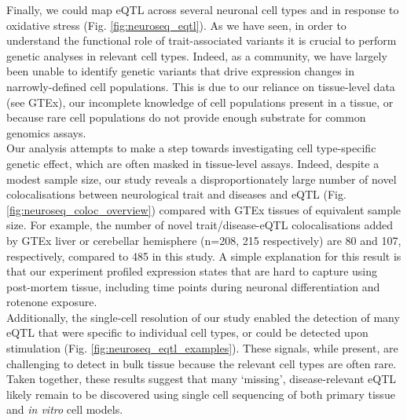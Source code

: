 
Finally,
we could map eQTL across several neuronal cell types and in response to oxidative stress (Fig. \ref{fig:neuroseq_eqtl}).
As we have seen, in order to understand the functional role of trait-associated variants it is crucial to perform genetic analyses in relevant cell types.
Indeed, as a community, we have largely been unable to identify genetic variants that drive expression changes in narrowly-defined cell populations.
This is due to our reliance on tissue-level data (see GTEx), our incomplete knowledge of cell populations present in a tissue, or because rare cell populations do not provide enough substrate for common genomics assays. \\

Our analysis attempts to make a step towards investigating cell type-specific genetic effect, which are often masked in tissue-level assays.
Indeed, despite a modest sample size, our study reveals a disproportionately large number of novel colocalisations between neurological trait and diseases and eQTL (Fig. \ref{fig:neuroseq_coloc_overview}) compared with GTEx tissues of equivalent sample size. 
For example, the number of novel trait/disease-eQTL colocalisations added by GTEx liver or cerebellar hemisphere (n=208, 215 respectively) are 80 and 107, respectively, compared to 485 in this study. 
A simple explanation for this result is that our experiment profiled expression states that are hard to capture using post-mortem tissue, including time points during neuronal differentiation and rotenone exposure. \\

Additionally, the single-cell resolution of our study enabled the detection of many eQTL that were specific to individual cell types, or could be detected upon stimulation (Fig. \ref{fig:neuroseq_eqtl_examples}).
These signals, while present, are challenging to detect in bulk tissue because the relevant cell types are often rare. 
Taken together, these results suggest that many `missing', disease-relevant eQTL likely remain to be discovered using single cell sequencing of both primary tissue and \textit{in vitro} cell models.\\



